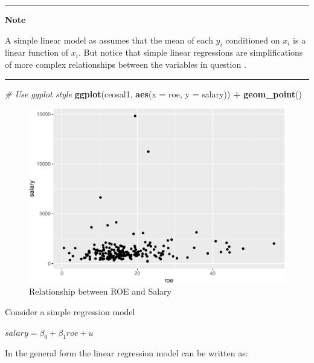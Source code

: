 \documentclass[]{book}
\newenvironment{Shaded}{\begin{snugshade}}{\end{snugshade}}
\newcommand{\CommentTok}[1]{\textcolor[rgb]{0.56,0.35,0.01}{\textit{#1}}}
\newcommand{\DataTypeTok}[1]{\textcolor[rgb]{0.13,0.29,0.53}{#1}}
\newcommand{\KeywordTok}[1]{\textcolor[rgb]{0.13,0.29,0.53}{\textbf{#1}}}
\newcommand{\NormalTok}[1]{#1}
\newcommand{\OperatorTok}[1]{\textcolor[rgb]{0.81,0.36,0.00}{\textbf{#1}}}
\newcommand{\StringTok}[1]{\textcolor[rgb]{0.31,0.60,0.02}{#1}}
\begin{document}
\begin{center}\rule{0.5\linewidth}{\linethickness}\end{center}

\textbf{Note}

A simple linear model as assumes that the mean of each \(y_{i}\) conditioned on \(x_{i}\)
is a linear function of \(x_{i}\). But notice that simple linear regressions are simplifications of more complex relationships between the variables in question \citet{dalpiaz2016}.

\begin{center}\rule{0.5\linewidth}{\linethickness}\end{center}

\begin{Shaded}
\begin{Highlighting}[]
\CommentTok{# Use ggplot style}
\KeywordTok{ggplot}\NormalTok{(ceosal1, }\KeywordTok{aes}\NormalTok{(}\DataTypeTok{x =}\NormalTok{ roe, }\DataTypeTok{y =}\NormalTok{ salary)) }\OperatorTok{+}
\StringTok{  }\KeywordTok{geom_point}\NormalTok{()}
\end{Highlighting}
\end{Shaded}

\begin{figure}
\centering
\includegraphics{MEM5220_R_files/figure-latex/ceosal1-1.pdf}
\caption{\label{fig:ceosal1}Relationship between ROE and Salary}
\end{figure}

Consider a simple regression model

\(salary = \beta_0 + \beta_1roe + u\)

In the general form the linear regression model can be written as:
\end{document}
